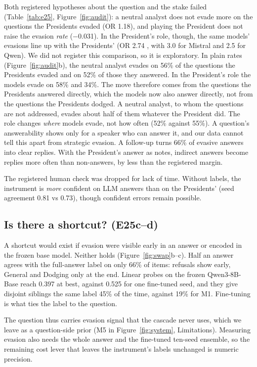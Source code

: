 Both registered hypotheses about the question and the stake failed (Table~\ref{tab:e25}, Figure~\ref{fig:audit}): a neutral analyst does not evade more on the questions the Presidents evaded (OR 1.18), and playing the President does not raise the evasion \emph{rate} ($-$0.031).
In the President's role, though, the same models' evasions line up with the Presidents' (OR 2.74 , with 3.0 for Mistral and 2.5 for Qwen). We did not register this comparison, so it is exploratory.
In plain rates (Figure~\ref{fig:audit}b), the neutral analyst evades on 56\% of the questions the Presidents evaded and on 52\% of those they answered. In the President's role the models evade on 58\% and 34\%.
The move therefore comes from the questions the Presidents answered directly, which the models now also answer directly, not from the questions the Presidents dodged. A neutral analyst, to whom the questions are not addressed, evades about half of them whatever the President did.
The role changes \emph{where} models evade, not how often (52\% against 55\%). A question's answerability shows only for a speaker who can answer it, and our data cannot tell this apart from strategic evasion.
A follow-up turns 66\% of evasive answers into clear replies.
With the President's answer as notes, indirect answers become replies more often than non-answers, by less than the registered margin.

The registered human check was dropped for lack of time. Without labels, the instrument is \emph{more} confident on LLM answers than on the Presidents' (seed agreement 0.81 vs 0.73), though confident errors remain possible.

\subsection{Is there a shortcut? (E25c--d)}
A shortcut would exist if evasion were visible early in an answer or encoded in the frozen base model. Neither holds (Figure~\ref{fig:swap}b--c).
Half an answer agrees with the full-answer label on only 66\% of items: refusals show early, General and Dodging only at the end.
Linear probes on the frozen Qwen3-8B-Base reach 0.397 \Stwo{} at best, against 0.525 for one fine-tuned seed, and they give disjoint siblings the same label 45\% of the time, against 19\% for M1. Fine-tuning is what ties the label to the question.

The question thus carries evasion signal that the cascade never uses, which we leave as a question-side prior (M5 in Figure~\ref{fig:system}, Limitations). Measuring evasion also needs the whole answer and the fine-tuned ten-seed ensemble, so the remaining cost lever that leaves the instrument's labels unchanged is numeric precision.
